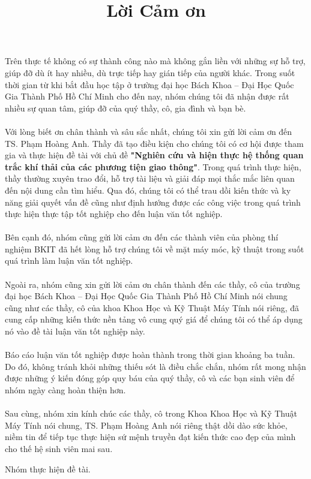 
\begin{acknowledgements}
\title{Lời Cảm ơn}      
Trên thực tế không có sự thành công nào mà không gắn liền với những sự hỗ trợ, giúp đỡ dù ít hay nhiều, dù trực tiếp hay gián tiếp của người khác. Trong suốt thời gian từ khi bắt đầu học tập ở trường đại học Bách Khoa – Đại Học Quốc Gia Thành Phố Hồ Chí Minh cho đến nay, nhóm chúng tôi đã nhận được rất nhiều sự quan tâm, giúp đỡ của quý thầy, cô, gia đình và bạn bè.\\\\
Với lòng biết ơn chân thành và sâu sắc nhất, chúng tôi xin gửi lời cảm ơn đến TS. Phạm Hoàng Anh. Thầy đã tạo điều kiện cho chúng tôi có cơ hội được tham gia và thực hiện đề tài với chủ đề \textbf{"Nghiên cứu và hiện thực hệ thống quan trắc khí thải của các phương tiện giao thông"}. Trong quá trình thực hiện, thầy thường xuyên trao đổi, hỗ trợ tài liệu và giải đáp mọi thắc mắc liên quan đến nội dung cần tìm hiểu. Qua đó, chúng tôi có thể trau dồi kiến thức và ky năng giải quyết vấn đề cũng như định hướng được các công việc trong quá trình thực hiện thực tập tốt nghiệp cho đến luận văn tốt nghiệp.\\\\
Bên cạnh đó, nhóm cũng gửi lời cảm ơn đến các thành viên của phòng thí nghiệm BKIT đã hết lòng hỗ trợ chúng tôi về mặt máy móc, kỹ thuật trong suốt quá trình làm luận văn tốt nghiệp.\\\\
Ngoài ra, nhóm cũng xin gửi lời cảm ơn chân thành đến các thầy, cô của trường đại học Bách Khoa – Đại Học Quốc Gia Thành Phố Hồ Chí Minh nói chung cũng như các thầy, cô của khoa Khoa Học và Kỹ Thuật Máy Tính nói riêng, đã cung cấp những kiến thức nền tảng vô cung quý giá để chúng tôi có thể áp dụng nó vào đề tài luận văn tốt nghiệp này.\\\\
Báo cáo luận văn tốt nghiệp được hoàn thành trong thời gian khoảng ba tuần. Do đó, không tránh khỏi những thiếu sót là điều chắc chắn, nhóm rất mong nhận được những ý kiến đóng góp quy báu của quý thầy, cô và các bạn sinh viên để nhóm ngày càng hoàn thiện hơn.\\\\
Sau cùng, nhóm xin kính chúc các thầy, cô trong Khoa Khoa Học và Kỹ Thuật Máy Tính nói chung, TS. Phạm Hoàng Anh nói riêng thật dồi dào sức khỏe, niềm tin để tiếp tục thực hiện sứ mệnh truyền đạt kiến thức cao đẹp của mình cho thế hệ sinh viên mai sau.

\begin{flushright}
Nhóm thực hiện đề tài.
\end{flushright} 



\end{acknowledgements}
